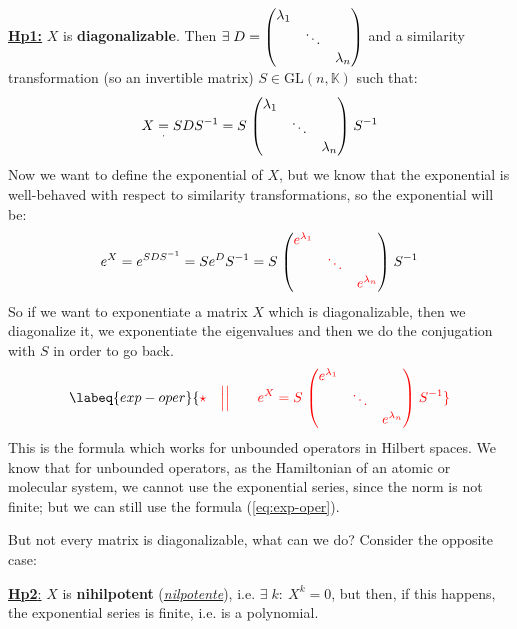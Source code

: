 \documentclass[../main.tex]{subfiles}
\begin{document}
\textbf{\underline{Hp1:}} $X$ is \textbf{diagonalizable}. Then $\exists\;D=\mqty(\dmat{\lambda_1,\ddots,\lambda_n})$ and a similarity transformation (so an invertible matrix) $S\in\textrm{GL}(n,\mathbb{K})$ such that:
\[
X\underset{\cdot}{=}SDS^{-1}=S\;\mqty(\dmat{\lambda_1,\ddots,\lambda_n})\;S^{-1}
\]
Now we want to define the exponential of $X$, but we know that the exponential is well-behaved with respect to similarity transformations, so the exponential will be:
\[
e^X=e^{SDS^{-1}}=Se^DS^{-1}=S\;\mqty(\dmat{{\color{red}e^{\lambda_1}},{\color{red}\ddots},{\color{red}e^{\lambda_n}}})\;S^{-1}
\]
So if we want to exponentiate a matrix $X$ which is diagonalizable, then we diagonalize it, we exponentiate the eigenvalues and then we do the conjugation with $S$ in order to go back.
\begin{equation}\labeq{exp-oper}
{\color{red}\star \quad \Big|\Big| \qquad e^X=S\;\mqty(\dmat{e^{\lambda_1},\ddots,e^{\lambda_n}})\;S^{-1}}
\end{equation}
This is the formula which works for unbounded operators in Hilbert spaces. We know that for unbounded operators, as the Hamiltonian of an atomic or molecular system, we cannot use the exponential series, since the norm is not finite; but we can still use the formula (\ref{eq:exp-oper}).

But not every matrix is diagonalizable, what can we do? Consider the opposite case:

\underline{\textbf{Hp2}:} $X$ is \textbf{nihilpotent} (\href{https://it.wikipedia.org/wiki/Nilpotente}{\textit{nilpotente}}), i.e. $\exists\;k:\ X^k=0$, but then, if this happens, the exponential series is finite, i.e. is a polynomial.
\end{document}
